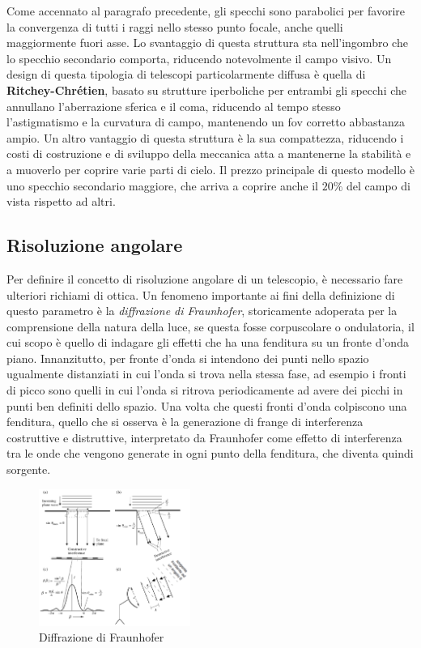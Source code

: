 Come accennato al paragrafo precedente, gli specchi sono parabolici per favorire la convergenza di tutti i raggi nello stesso punto focale, anche quelli maggiormente fuori asse. Lo svantaggio di questa struttura sta nell'ingombro che lo specchio secondario comporta, riducendo notevolmente il campo visivo. Un design di questa tipologia di telescopi particolarmente diffusa è quella di \textbf{Ritchey-Chrétien}, basato su strutture iperboliche per entrambi gli specchi che annullano l'aberrazione sferica e il coma, riducendo al tempo stesso l'astigmatismo e la curvatura di campo, mantenendo un fov corretto abbastanza ampio. Un altro vantaggio di questa struttura è la sua compattezza, riducendo i costi di costruzione e di sviluppo della meccanica atta a mantenerne la stabilità e a muoverlo per coprire varie parti di cielo. Il prezzo principale di questo modello è uno specchio secondario maggiore, che arriva a coprire anche il $20\%$ del campo di vista rispetto ad altri.

\subsection*{Risoluzione angolare}

Per definire il concetto di risoluzione angolare di un telescopio, è necessario fare ulteriori richiami di ottica. Un fenomeno importante ai fini della definizione di questo parametro è la \textit{diffrazione di Fraunhofer}, storicamente adoperata per la comprensione della natura della luce, se questa fosse corpuscolare o ondulatoria, il cui scopo è quello di indagare gli effetti che ha una fenditura su un fronte d'onda piano. Innanzitutto, per fronte d'onda si intendono dei punti nello spazio ugualmente distanziati in cui l'onda si trova nella stessa fase, ad esempio i fronti di picco sono quelli in cui l'onda si ritrova periodicamente ad avere dei picchi in punti ben definiti dello spazio. Una volta che questi fronti d'onda colpiscono una fenditura, quello che si osserva è la generazione di frange di interferenza costruttive e distruttive, interpretato da Fraunhofer come effetto di interferenza tra le onde che vengono generate in ogni punto della fenditura, che diventa quindi sorgente.

\begin{figure}
	\vspace{-10pt}
	\centering
	\includegraphics[width=0.44\textwidth]{Immagini/Capitolo2/Fraunhofer.PNG}
	\caption*{Diffrazione di Fraunhofer}
	\vspace{-10pt}
\end{figure}

